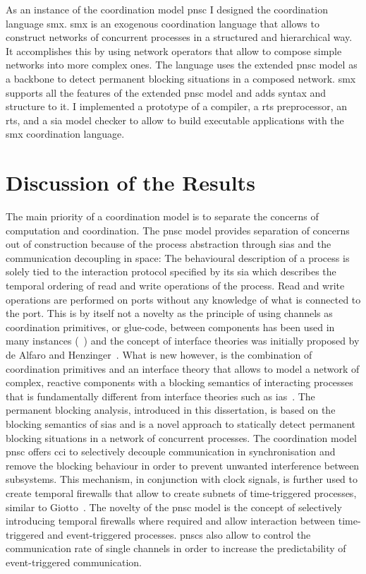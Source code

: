 As an instance of the coordination model \gls{pnsc} I designed the coordination language \gls*{smx}.
\Gls*{smx} is an exogenous coordination language that allows to construct networks of concurrent processes in a structured and hierarchical way.
It accomplishes this by using network operators that allow to compose simple networks into more complex ones.
The language uses the extended \gls{pnsc} model as a backbone to detect permanent blocking situations in a composed network.
\Gls*{smx} supports all the features of the extended \gls{pnsc} model and adds syntax and structure to it.
I implemented a prototype of a compiler, a \gls{rts} preprocessor, an \gls{rts}, and a \gls{sia} model checker to allow to build executable applications with the \gls*{smx} coordination language.

\section{Discussion of the Results}
\label{sect_conclusion_discussion}
The main priority of a coordination model is to separate the concerns of computation and coordination.
The \gls{pnsc} model provides separation of concerns out of construction because of the process abstraction through \glspl{sia} and the communication decoupling in space:
The behavioural description of a process is solely tied to the interaction protocol specified by its \gls{sia} which describes the temporal ordering of read and write operations of the process.
Read and write operations are performed on ports without any knowledge of what is connected to the port.
This is by itself not a novelty as the principle of using channels as coordination primitives, or glue-code, between components has been used in many instances
(\eg~\cite{arbab2004, grelck2010}) and the concept of interface theories was initially proposed by de Alfaro and Henzinger~\cite{deAlfaro2001}.
What is new however, is the combination of coordination primitives and an interface theory that allows to model a network of complex, reactive components with a blocking semantics of interacting processes that is fundamentally different from interface theories such as \glspl{ia}~\cite{deAlfaro2001a}.
The permanent blocking analysis, introduced in this dissertation, is based on the blocking semantics of \glspl{sia} and is a novel approach to statically detect permanent blocking situations in a network of concurrent processes.
The coordination model \gls{pnsc} offers \gls{cci} to selectively decouple communication in synchronisation and remove the blocking behaviour in order to prevent unwanted interference between subsystems.
This mechanism, in conjunction with clock signals, is further used to create temporal firewalls that allow to create subnets of time-triggered processes, similar to Giotto~\cite{henzinger2001}.
The novelty of the \gls{pnsc} model is the concept of selectively introducing temporal firewalls where required and allow interaction between time-triggered and event-triggered processes.
\Glspl{pnsc} also allow to control the communication rate of single channels in order to increase the predictability of event-triggered communication.

